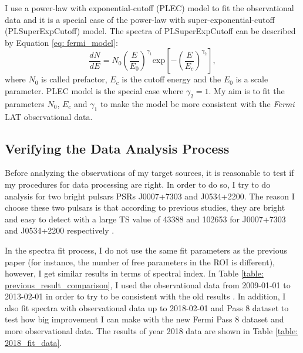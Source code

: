 \documentclass[a4paper, 12pt]{report}
\begin{document}
    I use a power-law with exponential-cutoff (PLEC) model to fit the 
    observational data and it is a special case of the power-law with 
    super-exponential-cutoff (PLSuperExpCutoff) model. The spectra of PLSuperExpCutoff 
    can be described by Equation \ref{eq: fermi_model}:  
    \begin{equation} 
      \label{eq: fermi_model}
      \frac{dN}{dE} = N_{0} \left(\frac{E}{E_0}\right)^{\gamma_1}\mbox{exp}\left[-\left(\frac{E}{E_c}\right)^{\gamma_2}\right] ,
    \end{equation}  
    where $N_0$ is called prefactor, $E_c$ is the cutoff energy and the $E_0$ is a scale 
    parameter. PLEC model is the special case where $\gamma_2=1$. My aim is to 
    fit the parameters $N_0$, $E_c$ and $\gamma_1$ to make the model be more 
    consistent with the \textit{Fermi} LAT observational data.

    \subsection{Verifying the Data Analysis Process}
      Before analyzing the observations of my target sources, it is reasonable to test 
      if my procedures for data processing are right. In order to do so, I try to do 
      analysis for two bright pulsars PSRs J0007+7303 and J0534+2200. The reason I choose 
      these two pulsars is that according to previous studies, they are bright and easy 
      to detect with a large TS value of 43388 and 102653 for J0007+7303 and J0534+2200 
      respectively \cite{0067-0049-208-2-17}.

      In the spectra fit process, I do not use the same fit parameters as the previous 
      paper (for instance, the number of free parameters in the ROI is different), 
      however, I get similar results in terms of spectral index.  
      In Table \ref{table: previous_result_comparison}, I used the observational data from 
      2009-01-01 to 2013-02-01 in order to try to be consistent with the old results 
      \cite{0067-0049-208-2-17}. In addition, I also fit spectra with 
      observational data up to 2018-02-01 and Pass 8 dataset to test how big improvement 
      I can make with the new Fermi Pass 8 dataset and more observational data. 
      The results of year 2018 data are shown in Table \ref{table: 2018_fit_data}.
\end{document}

